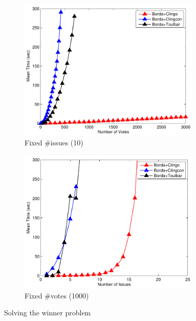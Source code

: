 {
	\begin{figure}
		\centering
    \begin{subfigure}[b]{0.45\textwidth}
			\centering
			\includegraphics[width=0.95\textwidth]{figs/LPTrees/win/bordaFISCICP.pdf}
			\caption{Fixed \#issues (10)}
		\end{subfigure}
    \begin{subfigure}[b]{0.45\textwidth}
			\centering
			\includegraphics[width=0.95\textwidth]{figs/LPTrees/win/bordaFVSCICP.pdf}
			\caption{Fixed \#votes (1000)}
		\end{subfigure}

		\caption{Solving the winner problem}
	\end{figure}
}

